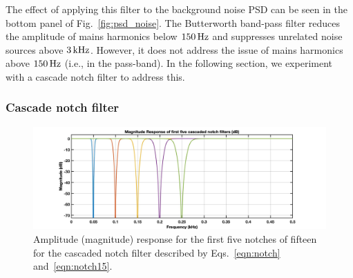 \documentclass[paper-main.tex]{subfiles}
\begin{document}
The effect of applying this filter to the background noise PSD can be seen in the bottom panel of Fig.~\ref{fig:psd_noise}. The Butterworth band-pass filter reduces the amplitude of mains harmonics below $150\,{\rm Hz}$ and suppresses unrelated noise sources above $3\,{\rm kHz}$. However, it does not address the issue of mains harmonics above $150\,{\rm Hz}$ (i.e., in the pass-band). In the following section, we experiment with a cascade notch filter to address this.



\subsubsection{Cascade notch filter}
\label{sec:notch}
\begin{figure}
\begin{center}
\includegraphics[width=.9\textwidth]{figures/notch_filter_response.jpg}
\end{center}
\caption{\label{fig:notchMagResponse}
Amplitude (magnitude) response for the first five notches of fifteen for the cascaded notch filter described by Eqs.~\ref{eqn:notch} and~\ref{eqn:notch15}. 
}
\end{figure}
\end{document}
